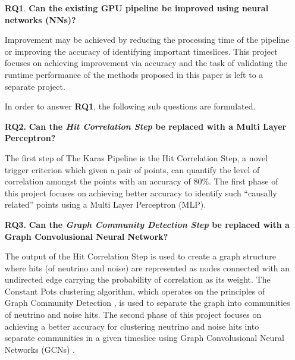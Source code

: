 \begin{enumerate}
  \item[\textbf{RQ1}.] \textbf{Can the existing GPU pipeline be improved using neural networks (NNs)?}

    Improvement may be achieved by reducing the processing time of the
    pipeline or improving the accuracy of identifying important
    timeslices. This project focuses on achieving improvement via
    accuracy and the task of validating the runtime performance of the
    methods proposed in this paper is left to a separate project.

    In order to answer \textbf{RQ1}, the following sub questions are
    formulated.

  \item[\textbf{RQ2.}] \textbf{Can the \emph{Hit Correlation Step} be replaced with a Multi Layer Perceptron?}

    The first step of The Karas Pipeline is the Hit Correlation Step,
    a novel trigger criterion which given a pair of points, can
    quantify the level of correlation amongst the points with an
    accuracy of 80\%. The first phase of this project focuses on
    achieving better accuracy to identify such ``causally related''
    points using a Multi Layer Perceptron (MLP).
    
  \item[\textbf{RQ3.}] \textbf{Can the \emph{Graph Community Detection Step} be replaced with a Graph Convolusional Neural Network?}

    The output of the Hit Correlation Step is used to create a graph
    structure where hits (of neutrino and noise) are represented as
    nodes connected with an undirected edge carrying the probability
    of correlation as its weight. The Constant Pots clustering
    algorithm, which operates on the principles of Graph Community
    Detection \cite{fortunato2010community}, is used to separate the
    graph into communities of neutrino and noise hits. The second
    phase of this project focuses on achieving a better accuracy for
    clustering neutrino and noise hits into separate communities in a
    given timeslice using Graph Convolusional Neural Networks (GCNs)
    \cite{kipf2016semi}.
\end{enumerate}

